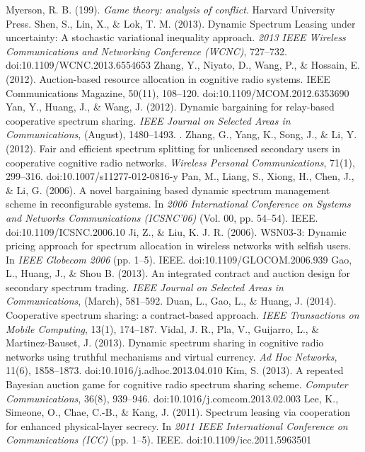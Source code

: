 \begin{thebibliography}{1}
 Myerson, R. B. (199). \textit{Game theory: analysis of conflict}. Harvard University Press. 
 Shen, S., Lin, X., \& Lok, T. M. (2013). Dynamic Spectrum Leasing under uncertainty: A stochastic variational inequality approach. \textit{2013 IEEE Wireless Communications and Networking Conference (WCNC)}, 727–732. doi:10.1109/WCNC.2013.6554653
 Zhang, Y., Niyato, D., Wang, P., \& Hossain, E. (2012). Auction-based resource allocation in cognitive radio systems. IEEE Communications Magazine, 50(11), 108–120. doi:10.1109/MCOM.2012.6353690
 Yan, Y., Huang, J., \& Wang, J. (2012). Dynamic bargaining for relay-based cooperative spectrum sharing. \textit{IEEE Journal on Selected Areas in Communications}, (August), 1480–1493.
. Zhang, G., Yang, K., Song, J., \& Li, Y. (2012). Fair and efficient spectrum splitting for unlicensed secondary users in cooperative cognitive radio networks. \textit{Wireless Personal Communications}, 71(1), 299–316. doi:10.1007/s11277-012-0816-y
 Pan, M., Liang, S., Xiong, H., Chen, J., \& Li, G. (2006). A novel bargaining based dynamic spectrum management scheme in reconfigurable systems. In \textit{2006 International Conference on Systems and Networks Communications (ICSNC’06)} (Vol. 00, pp. 54–54). IEEE. doi:10.1109/ICSNC.2006.10
 Ji, Z., \& Liu, K. J. R. (2006). WSN03-3: Dynamic pricing approach for spectrum allocation in wireless networks with selfish users. In \textit{IEEE Globecom 2006} (pp. 1–5). IEEE. doi:10.1109/GLOCOM.2006.939
 Gao, L., Huang, J., \& Shou B. (2013). An integrated contract and auction design for secondary spectrum trading. \textit{IEEE Journal on Selected Areas in Communications}, (March), 581–592. 
 Duan, L., Gao, L., \& Huang, J. (2014). Cooperative spectrum sharing: a contract-based approach. \textit{IEEE Transactions on Mobile Computing}, 13(1), 174–187. 
 Vidal, J. R., Pla, V., Guijarro, L., \& Martinez-Bauset, J. (2013). Dynamic spectrum sharing in cognitive radio networks using truthful mechanisms and virtual currency. \textit{Ad Hoc Networks}, 11(6), 1858–1873. doi:10.1016/j.adhoc.2013.04.010
 Kim, S. (2013). A repeated Bayesian auction game for cognitive radio spectrum sharing scheme. \textit{Computer Communications}, 36(8), 939–946. doi:10.1016/j.comcom.2013.02.003
Lee, K., Simeone, O., Chae, C.-B., \& Kang, J. (2011). Spectrum leasing via cooperation for enhanced physical-layer secrecy. In \textit{2011 IEEE International Conference on Communications (ICC)} (pp. 1–5). IEEE. doi:10.1109/icc.2011.5963501

\end{thebibliography}
